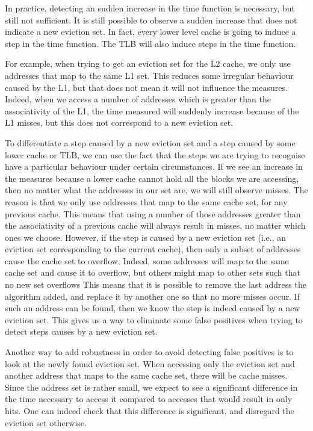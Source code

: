 \documentclass[a4paper,11pt,oneside]{report}
\begin{document}
In practice, detecting an sudden increase in the time function is necessary, but still not sufficient. It is still possible to observe a sudden increase that does not indicate a new eviction set. In fact, every lower level cache is going to induce a step in the time function. The TLB will also induce steps in the time function.

For example, when trying to get an eviction set for the L2 cache, we only use addresses that map to the same L1 set. This reduces some irregular behaviour caused by the L1, but that does not mean it will not influence the measures. Indeed, when we access a number of addresses which is greater than the associativity of the L1, the time measured will suddenly increase because of the L1 misses, but this does not correspond to a new eviction set.

To differentiate a step caused by a new eviction set and a step caused by some lower cache or TLB, we can use the fact that the steps we are trying to recognise have a particular behaviour under certain circumstances. If we see an increase in the measures because a lower cache cannot hold all the blocks we are accessing, then no matter what the addresses in our set are, we will still observe misses. The reason is that we only use addresses that map to the same cache set, for any previous cache. This means that using a number of those addresses greater than the associativity of a previous cache will always result in misses, no matter which ones we choose. However, if the step is caused by a new eviction set (i.e., an eviction set corresponding to the current cache), then only a subset of addresses cause the cache set to overflow. Indeed, some addresses will map to the same cache set and cause it to overflow, but others might map to other sets such that no new set overflows This means that it is possible to remove the last address the algorithm added, and replace it by another one so that no more misses occur. If such an address can be found, then we know the step is indeed caused by a new eviction set. This gives us a way to eliminate some false positives when trying to detect steps causes by a new eviction set.

Another way to add robustness in order to avoid detecting false positives is to look at the newly found eviction set. When accessing only the eviction set and another address that maps to the same cache set, there will be cache misses. Since the address set is rather small, we expect to see a significant difference in the time necessary to access it compared to accesses that would result in only hits. One can indeed check that this difference is significant, and disregard the eviction set otherwise.
\end{document}
